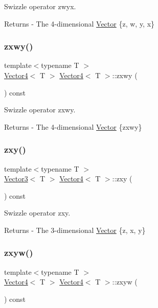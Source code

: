 Swizzle operator zwyx. \begin{DoxyReturn}{Returns}
-\/ The 4-\/dimensional \mbox{\hyperlink{class_vector}{Vector}} \{z, w, y, x\} 
\end{DoxyReturn}
\mbox{\label{class_vector4_acde5342f5d2865a0e0a451ecf57ed4d8}} 
\subsubsection{\texorpdfstring{zxwy()}{zxwy()}}
{\footnotesize\ttfamily template$<$typename T $>$ \\
\mbox{\hyperlink{class_vector4}{Vector4}}$<$ T $>$ \mbox{\hyperlink{class_vector4}{Vector4}}$<$ T $>$\+::zxwy (\begin{DoxyParamCaption}{ }\end{DoxyParamCaption}) const}

Swizzle operator zxwy. \begin{DoxyReturn}{Returns}
-\/ The 4-\/dimensional \mbox{\hyperlink{class_vector}{Vector}} \{zxwy\} 
\end{DoxyReturn}
\mbox{\label{class_vector4_aab381bde8b0a45e3ba956b173abfefcd}} 
\subsubsection{\texorpdfstring{zxy()}{zxy()}}
{\footnotesize\ttfamily template$<$typename T $>$ \\
\mbox{\hyperlink{class_vector3}{Vector3}}$<$ T $>$ \mbox{\hyperlink{class_vector4}{Vector4}}$<$ T $>$\+::zxy (\begin{DoxyParamCaption}{ }\end{DoxyParamCaption}) const}

Swizzle operator zxy. \begin{DoxyReturn}{Returns}
-\/ The 3-\/dimensional \mbox{\hyperlink{class_vector}{Vector}} \{z, x, y\} 
\end{DoxyReturn}
\mbox{\label{class_vector4_a11a11ad01317a703765646b26deb5373}} 
\subsubsection{\texorpdfstring{zxyw()}{zxyw()}}
{\footnotesize\ttfamily template$<$typename T $>$ \\
\mbox{\hyperlink{class_vector4}{Vector4}}$<$ T $>$ \mbox{\hyperlink{class_vector4}{Vector4}}$<$ T $>$\+::zxyw (\begin{DoxyParamCaption}{ }\end{DoxyParamCaption}) const}

